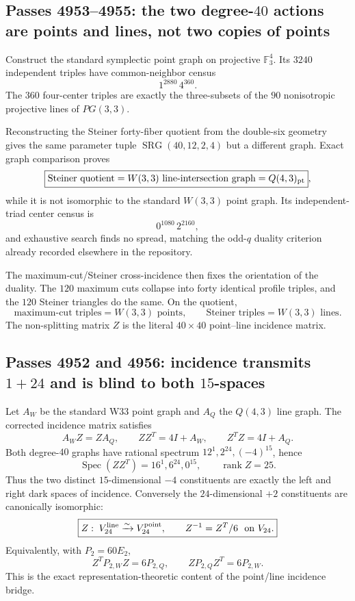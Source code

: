\subsection{Passes 4953--4955: the two degree-$40$ actions are points and lines, not two copies of points}
Construct the standard symplectic point graph on projective
$\mathbb F_3^4$.  Its $3240$ independent triples have common-neighbor census
\[
 1^{2880}\,4^{360}.
\]
The $360$ four-center triples are exactly the three-subsets of the $90$
nonisotropic projective lines of $PG(3,3)$.

Reconstructing the Steiner forty-fiber quotient from the double-six geometry
gives the same parameter tuple
$\operatorname{SRG}(40,12,2,4)$ but a different graph.  Exact graph comparison
proves
\[
 \boxed{\text{Steiner quotient}
 =\text{$W(3,3)$ line-intersection graph}
 =Q(4,3)_{\rm pt}},
\]
while it is not isomorphic to the standard $W(3,3)$ point graph.  Its
independent-triad center census is
\[
 0^{1080}\,2^{2160},
\]
and exhaustive search finds no spread, matching the odd-$q$ duality
criterion already recorded elsewhere in the repository.

The maximum-cut/Steiner cross-incidence then fixes the orientation of the
duality.  The $120$ maximum cuts collapse into forty identical profile
triples, and the $120$ Steiner triangles do the same.  On the quotient,
\[
 \boxed{
  \text{maximum-cut triples}=W(3,3)\text{ points},\qquad
  \text{Steiner triples}=W(3,3)\text{ lines}.}
\]
The non-splitting matrix $Z$ is the literal $40\times40$ point--line incidence
matrix.

\subsection{Passes 4952 and 4956: incidence transmits $1+24$ and is blind to both $15$-spaces}
Let $A_W$ be the standard W33 point graph and $A_Q$ the $Q(4,3)$ line graph.
The corrected incidence matrix satisfies
\[
 A_WZ=ZA_Q,
 \qquad ZZ^T=4I+A_W,
 \qquad Z^TZ=4I+A_Q.
\]
Both degree-$40$ graphs have rational spectrum
$12^1,2^{24},(-4)^{15}$, hence
\[
 \operatorname{Spec}(ZZ^T)
 =16^1,6^{24},0^{15},
 \qquad \operatorname{rank}Z=25.
\]
Thus the two distinct $15$-dimensional $-4$ constituents are exactly the left
and right dark spaces of incidence.  Conversely the $24$-dimensional
$+2$ constituents are canonically isomorphic:
\[
 \boxed{Z:\;V_{24}^{\rm line}\xrightarrow{\sim}V_{24}^{\rm point},
 \qquad Z^{-1}=Z^T/6\ \text{ on }V_{24}.}
\]
Equivalently, with $P_2=60E_2$,
\[
 Z^TP_{2,W}Z=6P_{2,Q},\qquad
 ZP_{2,Q}Z^T=6P_{2,W}.
\]
This is the exact representation-theoretic content of the point/line
incidence bridge.

